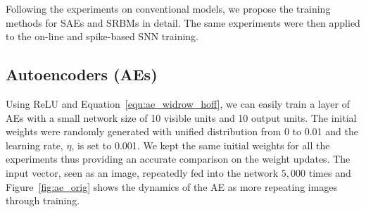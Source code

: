 Following the experiments on conventional models, we propose the training methods for SAEs and SRBMs in detail.
The same experiments were then applied to the on-line and spike-based SNN training.

\subsection{Autoencoders (AEs)}
\label{sec:ae}
Using ReLU and Equation~\ref{equ:ae_widrow_hoff}, we can easily train a layer of AEs with a small network size of 10 visible units and 10 output units.
The initial weights were randomly generated with unified distribution from 0 to 0.01 and the learning rate, $\eta$, is set to 0.001.
We kept the same initial weights for all the experiments thus providing an accurate comparison on the weight updates.
The input vector, seen as an image, repeatedly fed into the network $5,000$ times and Figure~\ref{fig:ae_orig} shows the dynamics of the AE as more repeating images \DIFdelbegin {}\DIFdelend \DIFaddbegin {}\DIFaddend through training.

